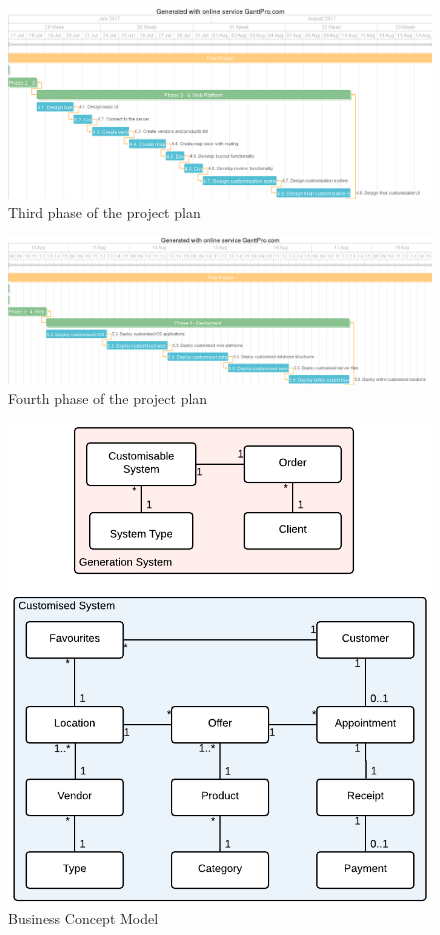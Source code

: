 \begin{figure}[!ht]
\centering
\includegraphics[scale=0.4]{img/phase3.png}
\caption{Third phase of the project plan}
\label{fig:phase3}
\end{figure}

\begin{figure}[!ht]
\centering
\includegraphics[scale=0.4]{img/phase4.png}
\caption{Fourth phase of the project plan}
\label{fig:phase4}
\end{figure}

\begin{figure}[!ht]
\centering
\includegraphics[scale=0.4]{img/Business_Concept_Model.png}
\caption{Business Concept Model}
\label{fig:business_concept_model}
\end{figure}

